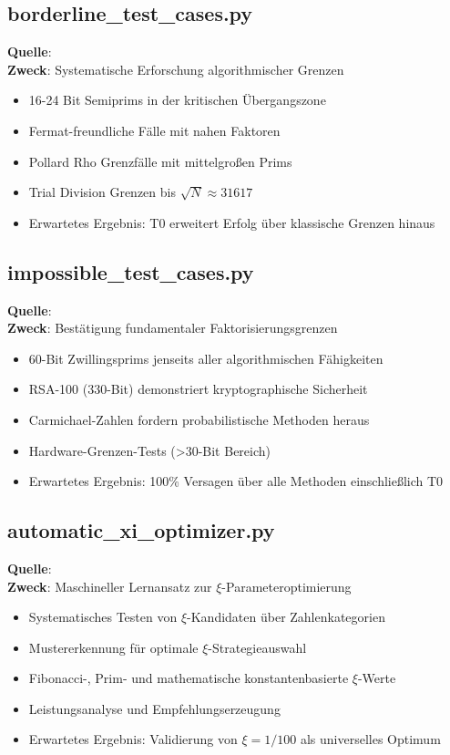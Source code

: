 	\subsection{borderline\_test\_cases.py}
	\textbf{Quelle}: \\
	\textbf{Zweck}: Systematische Erforschung algorithmischer Grenzen
	\begin{itemize}
		\item 16-24 Bit Semiprims in der kritischen Übergangszone
		\item Fermat-freundliche Fälle mit nahen Faktoren
		\item Pollard Rho Grenzfälle mit mittelgroßen Prims
		\item Trial Division Grenzen bis $\sqrt{N} \approx 31617$
		\item Erwartetes Ergebnis: T0 erweitert Erfolg über klassische Grenzen hinaus
	\end{itemize}
	
	\subsection{impossible\_test\_cases.py}
	\textbf{Quelle}: \\
	\textbf{Zweck}: Bestätigung fundamentaler Faktorisierungsgrenzen
	\begin{itemize}
		\item 60-Bit Zwillingsprims jenseits aller algorithmischen Fähigkeiten
		\item RSA-100 (330-Bit) demonstriert kryptographische Sicherheit
		\item Carmichael-Zahlen fordern probabilistische Methoden heraus
		\item Hardware-Grenzen-Tests (>30-Bit Bereich)
		\item Erwartetes Ergebnis: 100\% Versagen über alle Methoden einschließlich T0
	\end{itemize}
	
	\subsection{automatic\_xi\_optimizer.py}
	\textbf{Quelle}: \\
	\textbf{Zweck}: Maschineller Lernansatz zur $\xi$-Parameteroptimierung
	\begin{itemize}
		\item Systematisches Testen von $\xi$-Kandidaten über Zahlenkategorien
		\item Mustererkennung für optimale $\xi$-Strategieauswahl
		\item Fibonacci-, Prim- und mathematische konstantenbasierte $\xi$-Werte
		\item Leistungsanalyse und Empfehlungserzeugung
		\item Erwartetes Ergebnis: Validierung von $\xi = 1/100$ als universelles Optimum
	\end{itemize}
	
